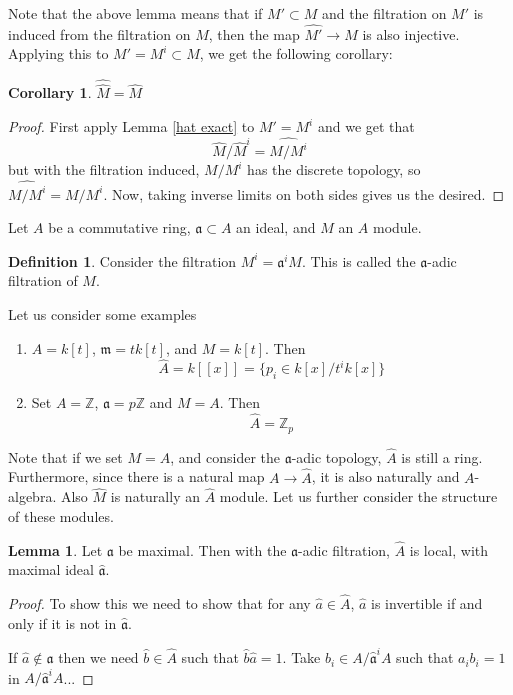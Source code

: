 \documentclass[12 pt]{article}
\theoremstyle{definition}
\newtheorem{cor}[thm]{Corollary}
\newtheorem{lemma}[thm]{Lemma}
\newtheorem{defn}[thm]{Definition}
\renewcommand{\(}{\left(}
\renewcommand{\)}{\right)}
\newcommand\zz{\mathbb{Z}}
\newcommand\fa{{\mathfrak a}}
\newcommand\fm{{\mathfrak m}}
\begin{document}
Note that the above lemma means that if $M' \subset M$ and the filtration on $M'$ is induced from the filtration on $M$, then the map $\widehat{M'} \to M$ is also injective. Applying this to $M'=M^i \subset M$, we get the following corollary:
\begin{cor} $\widehat{\widehat M}=\widehat{M}$
\end{cor}
\begin{proof} First apply Lemma \ref{hat exact} to $M'=M^i$ and we get that
\[\widehat M/\widehat{M}^i =\widehat{M/M^i}\]
but with the filtration induced, $M/M^i$ has the discrete topology, so $\widehat{M/M^i}=M/M^i$. Now, taking inverse limits on both sides gives us the desired.
\end{proof}


Let $A$ be a commutative ring, $\fa \subset A$ an ideal, and $M$ an $A$ module.
\begin{defn} Consider the filtration $M^i=\fa^iM$. This is called the $\fa$-adic filtration of $M$.
\end{defn}

Let us consider some examples
\begin{enumerate}
\item $A=k[t]$, $\fm=tk[t]$, and $M=k[t]$. Then
\[\hat{A}=k[[x]]=\{p_i \in k[x]/t^ik[x]\}\]

\item Set $A=\zz$, $\fa=p\zz$ and $M=A$. Then
\[\hat{A}=\zz_p\]
\end{enumerate}

Note that if we set $M=A$, and consider the $\fa$-adic topology, $\hat{A}$ is still a ring. Furthermore, since there is a natural map $A \to \hat{A}$, it is also naturally and $A$-algebra. Also $\hat{M}$ is naturally an $\hat{A}$ module. Let us further consider the structure of these modules.

\begin{lemma} Let $\fa$ be maximal. Then with the $\fa$-adic filtration, $\widehat{A}$ is local, with maximal ideal $\hat{\fa}$.
\label{completion local}
\end{lemma}
\begin{proof} To show this we need to show that for any $\hat{a} \in \hat{A}$, $\hat{a}$ is invertible if and only if it is not in $\hat{\fa}$.

If $\hat{a} \not \in \hat{\fa}$ then we need $\hat{b} \in \hat{A}$ such that $\hat{b}\hat{a}=1$. Take $b_i \in A/\hat{\fa}^iA$ such that $a_ib_i=1$ in $A/\hat{\fa}^iA$...
\end{proof}
\end{document}

